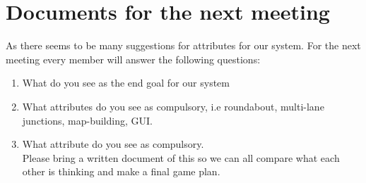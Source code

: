 \documentclass{article}
\begin{document}
	\section{Documents for the next meeting}
	As there seems to be many suggestions for attributes for our system. 
	For the next meeting every member will answer the following questions:
	
	\begin{enumerate}
		\item What do you see as the end goal for our system 
		\item What attributes do you see as compulsory, i.e roundabout, multi-lane junctions, map-building, GUI.
		\item What attribute do you see as compulsory.\\
		
		Please bring a written document of this so we can all compare what each other is thinking and make a final game plan.  
	\end{enumerate}
	
	
		
	
\end{document}
